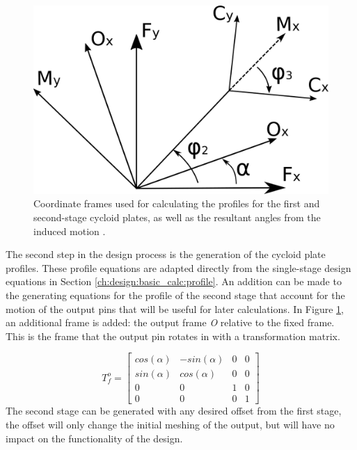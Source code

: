 \begin{figure}[t]
	\centering
	\includegraphics[width=0.50\linewidth]{fig/two_stage_frames}
   \caption{Coordinate frames used for calculating the profiles for the first and second-stage cycloid plates, as well as the resultant angles from the induced motion \textalpha.}
   \label{fig:two_stage_frame}
\end{figure}

The second step in the design process is the generation of the cycloid plate profiles. These profile equations are adapted directly from the single-stage design equations in Section \ref{ch:design:basic_calc:profile}. An addition can be made to the generating equations for the profile of the second stage that account for the motion of the output pins that will be useful for later calculations. In Figure \ref{fig:two_stage_frame}, an additional frame is added: the output frame \textit{O} relative to the fixed frame. This is the frame that the output pin rotates in with a transformation matrix. 

\begin{equation} \label{eq:T_fo}
T_f^o = \left[{\begin{array}{cccc}
		cos(\alpha) & -sin(\alpha) & 0 & 0\\
		sin(\alpha) & cos(\alpha) & 0 & 0\\
		0 & 0 & 1 & 0\\
		0 & 0 & 0 & 1 \end{array} } \right]
\end{equation}
The second stage can be generated with any desired offset from the first stage, the offset will only change the initial meshing of the output, but will have no impact on the functionality of the design. 

